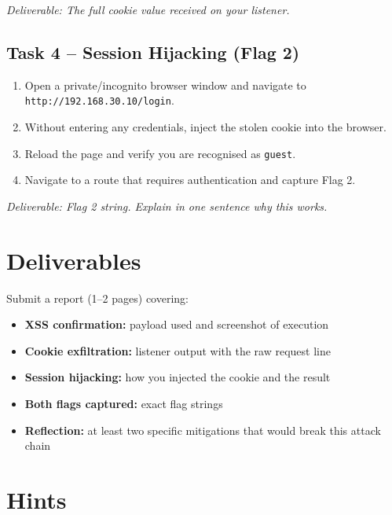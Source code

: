 \documentclass[a4paper, 12pt]{article}
\begin{document}
\textit{Deliverable: The full cookie value received on your listener.}

\subsection{Task 4 -- Session Hijacking (Flag 2)}

\begin{enumerate}[leftmargin=2em]
    \item Open a private/incognito browser window and navigate to
          \texttt{http://192.168.30.10/login}.
    \item Without entering any credentials, inject the stolen cookie into the browser.
    \item Reload the page and verify you are recognised as \texttt{guest}.
    \item Navigate to a route that requires authentication and capture Flag 2.
\end{enumerate}

\textit{Deliverable: Flag 2 string. Explain in one sentence why this works.}

\section{Deliverables}

Submit a report (1--2 pages) covering:

\begin{itemize}[leftmargin=1.5em]
    \item \textbf{XSS confirmation:} payload used and screenshot of execution
    \item \textbf{Cookie exfiltration:} listener output with the raw request line
    \item \textbf{Session hijacking:} how you injected the cookie and the result
    \item \textbf{Both flags captured:} exact flag strings
    \item \textbf{Reflection:} at least two specific mitigations that would break
          this attack chain
\end{itemize}

\section{Hints}
\end{document}
